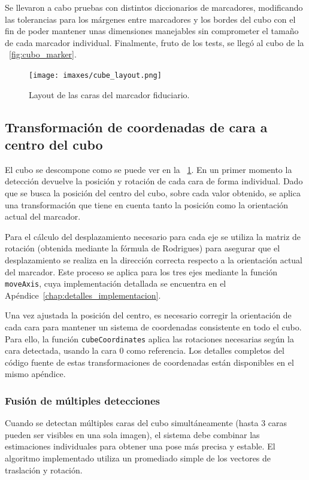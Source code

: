 Se llevaron a cabo pruebas con distintos diccionarios de marcadores, modificando las tolerancias para los márgenes entre marcadores y los bordes del cubo con el fin de poder mantener unas dimensiones manejables sin comprometer el tamaño de cada marcador individual.
Finalmente, fruto de los tests, se llegó al cubo de la \figurename~\ref{fig:cubo_marker}.

\begin{figure}
	\centering
	\texttt{[image: imaxes/cube\_layout.png]}
	\caption{Layout de las caras del marcador fiduciario.}
	\label{fig:cube_layout}
\end{figure}

\subsection{Transformación de coordenadas de cara a centro del cubo}

El cubo se descompone como se puede ver en la \figurename~\ref{fig:cube_layout}. En un primer momento la detección devuelve la posición y rotación de cada cara de forma individual. Dado que se busca la posición del centro del cubo, sobre cada valor obtenido, se aplica una transformación que tiene en cuenta tanto la posición como la orientación actual del marcador.

Para el cálculo del desplazamiento necesario para cada eje se utiliza la matriz de rotación (obtenida mediante la fórmula de Rodrigues) para asegurar que el desplazamiento se realiza en la dirección correcta respecto a la orientación actual del marcador. Este proceso se aplica para los tres ejes mediante la función \texttt{moveAxis}, cuya implementación detallada se encuentra en el Apéndice~\ref{chap:detalles_implementacion}.

Una vez ajustada la posición del centro, es necesario corregir la orientación de cada cara para mantener un sistema de coordenadas consistente en todo el cubo. Para ello, la función \texttt{cubeCoordinates} aplica las rotaciones necesarias según la cara detectada, usando la cara 0 como referencia. Los detalles completos del código fuente de estas transformaciones de coordenadas están disponibles en el mismo apéndice.

\subsubsection{Fusión de múltiples detecciones}
Cuando se detectan múltiples caras del cubo simultáneamente (hasta 3 caras pueden ser visibles en una sola imagen), el sistema debe combinar las estimaciones individuales para obtener una pose más precisa y estable. El algoritmo implementado utiliza un promediado simple de los vectores de traslación y rotación.

